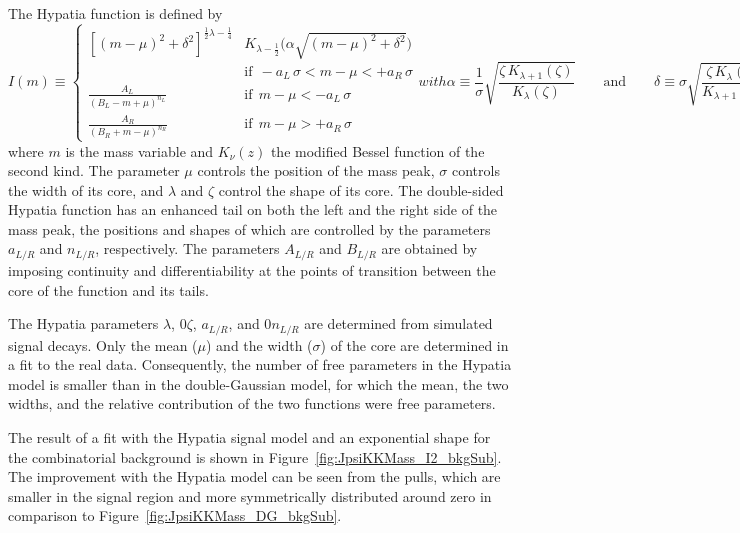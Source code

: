 The Hypatia function is defined by
\begin{subequations}
\begin{equation}
  I(m) \equiv
  \begin{cases}
    \left[(m-\mu)^{2} + \delta^{2}\right]^{\frac{1}{2} \lambda - \frac{1}{4}}
          \!\!\!\!& K_{\lambda - \frac{1}{2}}\big(\alpha \sqrt{(m-\mu)^2 + \delta^2}\big) \\
          &\text{if}\ \ -a_L\,\sigma < m - \mu < +a_R\,\sigma \\
    \frac{A_L}{(B_L - m+\mu)^{n_L}} &\text{if}\ \ m - \mu < -a_L\,\sigma \\
    \frac{A_R}{(B_R + m-\mu)^{n_R}} &\text{if}\ \ m - \mu > +a_R\,\sigma
  \end{cases}
\end{equation}
with
\begin{equation}
  \alpha\equiv\frac{1}{\sigma}\sqrt{\frac{\zeta\, K_{\lambda+1}(\zeta)}{K_\lambda(\zeta)}}
  \qquad\text{and}\qquad
  \delta\equiv\sigma\sqrt{\frac{\zeta\,K_\lambda(\zeta)}{K_{\lambda+1}(\zeta)}} \ ,
\end{equation}
\end{subequations}
where $m$ is the mass variable and $K_{\nu}(z)$ the modified Bessel function of the second kind. The parameter $\mu$ controls the position
of the mass peak, $\sigma$ controls the width of its core, and $\lambda$ and $\zeta$ control the shape of its core. The double-sided
Hypatia function has an enhanced tail on both the left and the right side of the mass peak, the positions and shapes of which are
controlled by the parameters $a_{L/R}$ and $n_{L/R}$, respectively. The parameters $A_{L/R}$ and $B_{L/R}$ are obtained by imposing
continuity and differentiability at the points of transition between the core of the function and its tails.

The Hypatia parameters $\lambda$\textapprox{}, 0\textlt$\zeta$, $a_{L/R}$, and 0\textlt$n_{L/R}$ are
determined from simulated \BstoJpsiphi{} signal decays. Only the mean ($\mu$\unitsp\MeV) and the width
($\sigma$\unitsp\MeV) of the core are determined in a fit to the real data. Consequently, the number of free parameters in the
Hypatia model is smaller than in the double-Gaussian model, for which the mean, the two widths, and the relative contribution of the two
functions were free parameters.

The result of a fit with the Hypatia signal model and an exponential shape for the combinatorial background is shown in
Figure~\ref{fig:JpsiKKMass_I2_bkgSub}. The improvement with the Hypatia model can be seen from the pulls, which are smaller in the signal
region and more symmetrically distributed around zero in comparison to Figure~\ref{fig:JpsiKKMass_DG_bkgSub}.


